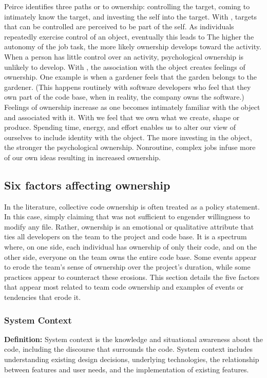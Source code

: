 Peirce identifies three paths or  to ownership: controlling the target, coming to intimately know the target, and investing the self into the target. With , targets that can be controlled are perceived to be part of the self.  As  individuals repeatedly exercise control of an object, eventually this leads to  The higher the autonomy of the job task, the more likely ownership develops toward the activity. When a person has little control over an activity, psychological ownership is unlikely to develop. With , the association with the object creates feelings of ownership. One example is when a gardener feels that the garden belongs to the gardener. (This happens routinely with software developers who feel that they own part of the code base, when in reality, the company owns the software.) Feelings of ownership increase as one becomes intimately familiar with the object and associated with it. With  we feel that we own what we create, shape or produce. Spending time, energy, and effort enables us to alter our view of ourselves to include identity with the object. The more investing in the object, the stronger the psychological ownership. Nonroutine, complex jobs infuse more of our own ideas resulting in increased ownership.

\subsection{Six factors affecting ownership}
In the literature, collective code ownership is often treated as a policy statement. In this case, simply claiming that  was not sufficient to engender willingness to modify any file. Rather, ownership is an emotional or qualitative attribute that ties all developers on the team to the project and code base. It is a spectrum where, on one side, each individual has ownership of only their code, and on the other side, everyone on the team owns the entire code base. Some events appear to erode the team's sense of ownership over the project’s duration, while some practices appear to counteract these erosions. This section details the five factors that appear most related to team code ownership and examples of events or tendencies that erode it. 

\subsubsection{System Context}
\textbf{Definition:} System context is the knowledge and situational awareness about the code, including the discourse that surrounds the code. System context includes understanding existing design decisions, underlying technologies, the relationship between features and user needs, and the implementation of existing features.

